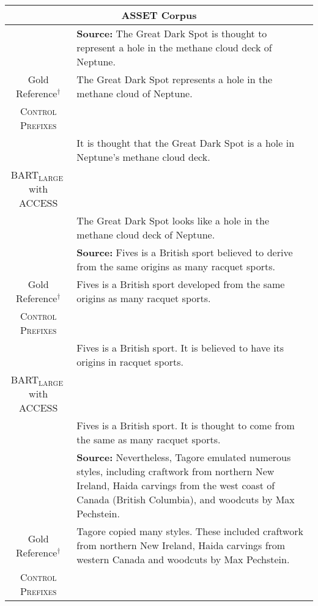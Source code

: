 \documentclass[11pt]{article}
\newcommand{\control}{\textsc{Control Prefixes}\xspace}
\newcommand{\bartl}{BART$_{\text {LARGE }}$}
\begin{document}
\begin{table*}[bth!]
\scriptsize
  \centering
  \renewcommand{\arraystretch}{1.3}
  \begin{tabular}{c|p{}}
  \hline
 
  \multicolumn{2}{c}{\textbf{ASSET Corpus}} \\ \hline
 & \textbf{Source:} The Great Dark Spot is thought to represent a hole in the methane cloud deck of Neptune. \\ \hline

  
Gold Reference$^\dagger$
& The Great Dark Spot represents a hole in the methane cloud of Neptune. \\ \hline
\control  \\
& It is thought that the Great Dark Spot is a hole in Neptune's methane cloud deck.\\ \hline
\bartl with ACCESS \\

& The Great Dark Spot looks like a hole in the methane cloud deck of Neptune.
\\ \midrule \hline

 & \textbf{Source:} Fives is a British sport believed to derive from the same origins as many racquet sports. \\ \hline

  
Gold Reference$^\dagger$
& Fives is a British sport developed from the same origins as many racquet sports. \\ \hline
\control \\


& Fives is a British sport. It is believed to have its origins in racquet sports.\\ \hline
\bartl with ACCESS \\

& Fives is a British sport. It is thought to come from the same as many racquet sports.
\\ \midrule \hline

 & \textbf{Source:} Nevertheless, Tagore emulated numerous styles, including craftwork from northern New Ireland, Haida carvings from the west coast of Canada (British Columbia), and woodcuts by Max Pechstein. \\ \hline

  
Gold Reference$^\dagger$
& Tagore copied many styles. These included craftwork from northern New Ireland, Haida carvings from western Canada and woodcuts by Max Pechstein. \\ \hline
\control\\



\end{tabular}
\end{table*}
\end{document}
